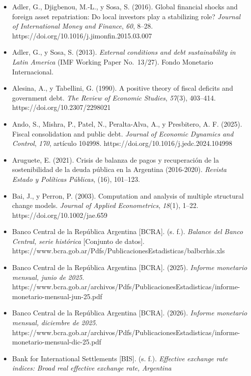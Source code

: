 \begin{itemize}[label={},leftmargin=1.27cm,itemindent=-1.27cm,itemsep=0.6\baselineskip]
\tightlist
\item
  Adler, G., Djigbenou, M.-L., y Sosa, S. (2016). Global financial
  shocks and foreign asset repatriation: Do local investors play a
  stabilizing role? \emph{Journal of International Money and Finance},
  \emph{60}, 8--28. https://doi.org/10.1016/j.jimonfin.2015.03.007
\item
  Adler, G., y Sosa, S. (2013). \emph{External conditions and debt
  sustainability in Latin America} (IMF Working Paper No.~13/27). Fondo
  Monetario Internacional.
\item
  Alesina, A., y Tabellini, G. (1990). A positive theory of fiscal
  deficits and government debt. \emph{The Review of Economic Studies},
  \emph{57}(3), 403--414. https://doi.org/10.2307/2298021
\item
  Ando, S., Mishra, P., Patel, N., Peralta-Alva, A., y Presbitero, A. F.
  (2025). Fiscal consolidation and public debt. \emph{Journal of
  Economic Dynamics and Control}, \emph{170}, artículo 104998.
  https://doi.org/10.1016/j.jedc.2024.104998
\item
  Aruguete, E. (2021). Crisis de balanza de pagos y recuperación de la
  sostenibilidad de la deuda pública en la Argentina (2016-2020).
  \emph{Revista Estado y Políticas Públicas}, (16), 101--123.
\item
  Bai, J., y Perron, P. (2003). Computation and analysis of multiple
  structural change models. \emph{Journal of Applied Econometrics},
  \emph{18}(1), 1--22. https://doi.org/10.1002/jae.659
\item
  Banco Central de la República Argentina {[}BCRA{]}. (s. f.).
  \emph{Balance del Banco Central, serie histórica} {[}Conjunto de
  datos{]}.
  https://www.bcra.gob.ar/Pdfs/PublicacionesEstadisticas/balbcrhis.xls
\item
  Banco Central de la República Argentina {[}BCRA{]}. (2025).
  \emph{Informe monetario mensual, junio de 2025}.
  https://www.bcra.gob.ar/archivos/Pdfs/PublicacionesEstadisticas/informe-monetario-mensual-jun-25.pdf
\item
  Banco Central de la República Argentina {[}BCRA{]}. (2026).
  \emph{Informe monetario mensual, diciembre de 2025}.
  https://www.bcra.gob.ar/archivos/Pdfs/PublicacionesEstadisticas/informe-monetario-mensual-dic-25.pdf
\item
  Bank for International Settlements {[}BIS{]}. (s. f.). \emph{Effective
  exchange rate indices: Broad real effective exchange rate, Argentina}

\end{itemize}
